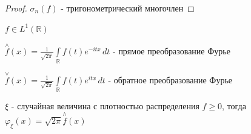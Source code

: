 \begin{proof}
    $\sigma_n (f)$ - тригонометрический многочлен
\end{proof}


\begin{definition}
    $f \in L^1 (\mathbb{R})$

    $\overset{\wedge}{f} (x) = \frac{1}{\sqrt{2\pi}} \int\limits_{\mathbb{R}} f(t) e^{-itx} \, dt$ - прямое преобразование Фурье
    
    $\overset{\vee}{f} (x) = \frac{1}{\sqrt{2\pi}} \int\limits_{\mathbb{R}} f(t) e^{itx} \, dt$ - обратное преобразование Фурье

\end{definition}

\begin{remark}
    $\xi$ - случайная величина с плотностью распределения $f \geqslant 0$, тогда $\varphi_\xi (x) = \sqrt{2\pi} \overset{\wedge}{f} (x) $
\end{remark}

